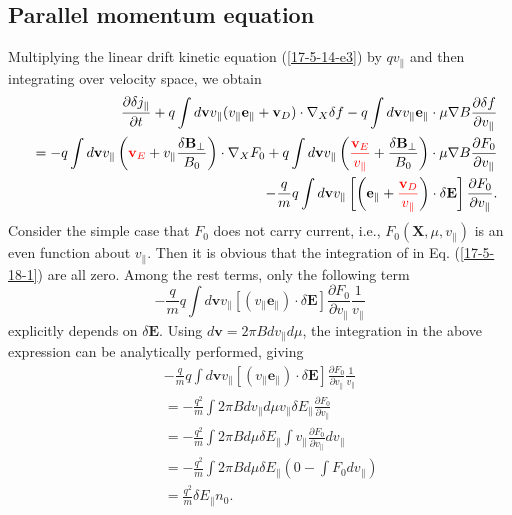 \documentclass{llncs}
\newcommand{\tmcolor}[2]{{\color{#1}{#2}}}
\begin{document}
\subsection{Parallel momentum equation}

Multiplying the linear drift kinetic equation (\ref{17-5-14-e3}) by $q
v_{\parallel}$ and then integrating over velocity space, we obtain
\begin{eqnarray}
  &  & \frac{\partial \delta j_{\parallel}}{\partial t} + q \int
  d\mathbf{v}v_{\parallel} (v_{\parallel} \mathbf{e}_{\parallel}
  +\mathbf{v}_D) \cdot \nabla_X \delta f - q \int d\mathbf{v}v_{\parallel}
  \mathbf{e}_{\parallel} \cdot \mu \nabla B \frac{\partial \delta f}{\partial
  v_{\parallel}} \nonumber\\
  &  & = - q \int d\mathbf{v}v_{\parallel} \left( \tmcolor{red}{\mathbf{v}_E}
  + v_{\parallel} \frac{\delta \mathbf{B}_{\perp}}{B_0} \right) \cdot \nabla_X
  F_0 + q \int d\mathbf{v}v_{\parallel} \left(
  \tmcolor{red}{\frac{\mathbf{v}_E}{v_{\parallel}}} + \frac{\delta
  \mathbf{B}_{\perp}}{B_0} \right) \cdot \mu \nabla B \frac{\partial
  F_0}{\partial v_{\parallel}} \nonumber\\
  &  & - \frac{q}{m} q \int d\mathbf{v}v_{\parallel} \left[ \left(
  \mathbf{e}_{\parallel} + \tmcolor{red}{\frac{\mathbf{v}_D}{v_{\parallel}}}
  \right) \cdot \delta \mathbf{E} \right] \frac{\partial F_0}{\partial
  v_{\parallel}} .  \label{17-5-18-1}
\end{eqnarray}
Consider the simple case that $F_0$ does not carry current, i.e., $F_0
(\mathbf{X}, \mu, v_{\parallel})$ is an even function about $v_{\parallel}$.
Then it is obvious that the integration of \tmcolor{red}{the terms in red} in
Eq. (\ref{17-5-18-1}) are all zero. Among the rest terms, only the following
term
\begin{equation}
  \label{17-5-15-p3} - \frac{q}{m} q \int d\mathbf{v}v_{\parallel}
  [(v_{\parallel} \mathbf{e}_{\parallel}) \cdot \delta \mathbf{E}]
  \frac{\partial F_0}{\partial v_{\parallel}}  \frac{1}{v_{\parallel}}
\end{equation}
explicitly depends on $\delta \mathbf{E}$. Using $d\mathbf{v}= 2 \pi B d
v_{\parallel} d \mu$, the integration in the above expression can be
analytically performed, giving
\begin{eqnarray}
  &  & - \frac{q}{m} q \int d\mathbf{v}v_{\parallel} [(v_{\parallel}
  \mathbf{e}_{\parallel}) \cdot \delta \mathbf{E}] \frac{\partial
  F_0}{\partial v_{\parallel}}  \frac{1}{v_{\parallel}} \nonumber\\
  &  & = - \frac{q^2}{m} \int 2 \pi B d v_{\parallel} d \mu v_{\parallel}
  \delta E_{\parallel} \frac{\partial F_0}{\partial v_{\parallel}} 
  \nonumber\\
  &  & = - \frac{q^2}{m} \int 2 \pi B d \mu \delta E_{\parallel} \int
  v_{\parallel} \frac{\partial F_0}{\partial v_{\parallel}} d v_{\parallel}
  \nonumber\\
  &  & = - \frac{q^2}{m} \int 2 \pi B d \mu \delta E_{\parallel} \left( 0 -
  \int F_0 d v_{\parallel} \right) \nonumber\\
  &  & = \frac{q^2}{m} \delta E_{\parallel} n_0 . 
\end{eqnarray}
\end{document}
